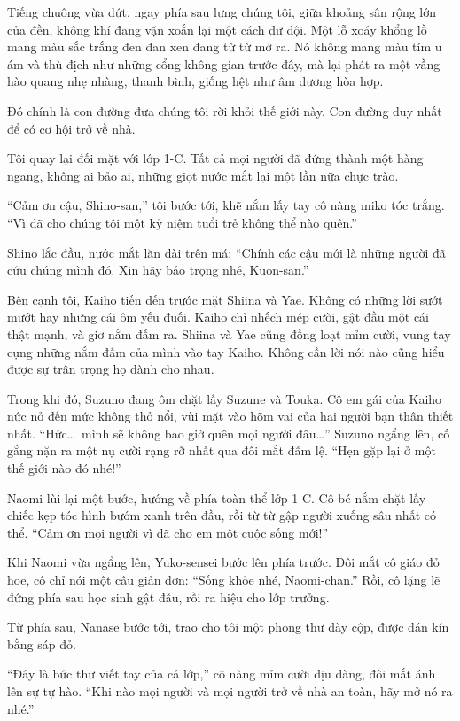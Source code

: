 \documentclass[../main.tex]{subfiles}
\begin{document}
Tiếng chuông vừa dứt, ngay phía sau lưng chúng tôi, giữa khoảng sân rộng lớn của đền, không khí đang vặn xoắn lại một cách dữ dội. Một lỗ xoáy khổng lồ mang màu sắc trắng đen đan xen đang từ từ mở ra. Nó không mang màu tím u ám và thù địch như những cổng không gian trước đây, mà lại phát ra một vầng hào quang nhẹ nhàng, thanh bình, giống hệt như âm dương hòa hợp.


Đó chính là con đường đưa chúng tôi rời khỏi thế giới này. Con đường duy nhất để có cơ hội trở về nhà.

Tôi quay lại đối mặt với lớp 1-C. Tất cả mọi người đã đứng thành một hàng ngang, không ai bảo ai, những giọt nước mắt lại một lần nữa chực trào.

``Cảm ơn cậu, Shino-san,'' tôi bước tới, khẽ nắm lấy tay cô nàng miko tóc trắng. ``Vì đã cho chúng tôi một kỷ niệm tuổi trẻ không thể nào quên.''

Shino lắc đầu, nước mắt lăn dài trên má: ``Chính các cậu mới là những người đã cứu chúng mình đó. Xin hãy bảo trọng nhé, Kuon-san.''

Bên cạnh tôi, Kaiho tiến đến trước mặt Shiina và Yae. Không có những lời sướt mướt hay những cái ôm yếu đuối. Kaiho chỉ nhếch mép cười, gật đầu một cái thật mạnh, và giơ nắm đấm ra. Shiina và Yae cũng đồng loạt mỉm cười, vung tay cụng những nắm đấm của mình vào tay Kaiho. Không cần lời nói nào cũng hiểu được sự trân trọng họ dành cho nhau.

Trong khi đó, Suzuno đang ôm chặt lấy Suzune và Touka. Cô em gái của Kaiho nức nở đến mức không thở nổi, vùi mặt vào hõm vai của hai người bạn thân thiết nhất. ``Hức\dots\ mình sẽ không bao giờ quên mọi người đâu\dots'' Suzuno ngẩng lên, cố gắng nặn ra một nụ cười rạng rỡ nhất qua đôi mắt đẫm lệ. ``Hẹn gặp lại ở một thế giới nào đó nhé!''

Naomi lùi lại một bước, hướng về phía toàn thể lớp 1-C. Cô bé nắm chặt lấy chiếc kẹp tóc hình bướm xanh trên đầu, rồi từ từ gập người xuống sâu nhất có thể. ``Cảm ơn mọi người vì đã cho em một cuộc sống mới!''

Khi Naomi vừa ngẩng lên, Yuko-sensei bước lên phía trước. Đôi mắt cô giáo đỏ hoe, cô chỉ nói một câu giản đơn: ``Sống khỏe nhé, Naomi-chan.'' Rồi, cô lặng lẽ đứng phía sau học sinh gật đầu, rồi ra hiệu cho lớp trưởng.

Từ phía sau, Nanase bước tới, trao cho tôi một phong thư dày cộp, được dán kín bằng sáp đỏ.

``Đây là bức thư viết tay của cả lớp,'' cô nàng mỉm cười dịu dàng, đôi mắt ánh lên sự tự hào. ``Khi nào mọi người và mọi người trở về nhà an toàn, hãy mở nó ra nhé.''
\end{document}
